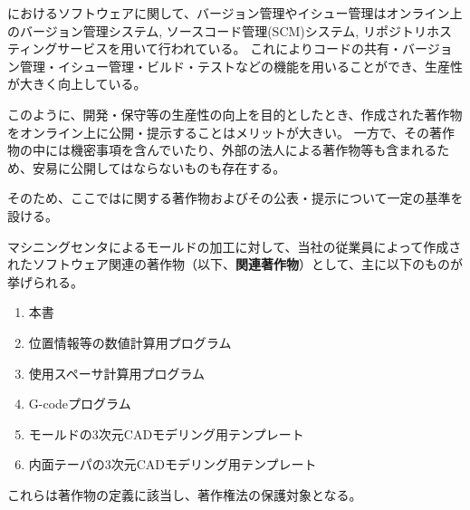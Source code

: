 

\DMname におけるソフトウェアに関して、バージョン管理やイシュー管理はオンライン上のバージョン管理システム, ソースコード管理(SCM)システム, リポジトリホスティングサービスを用いて行われている。
これによりコードの共有・バージョン管理・イシュー管理・ビルド・テストなどの機能を用いることができ、生産性が大きく向上している。

このように、開発・保守等の生産性の向上を目的としたとき、作成された著作物をオンライン上に公開・提示することはメリットが大きい。
一方で、その著作物の中には機密事項を含んでいたり、外部の法人による著作物等も含まれるため、安易に公開してはならないものも存在する。

そのため、ここでは\DMname に関する著作物およびその公表・提示について一定の基準を設ける。



マシニングセンタによるモールドの加工に対して、当社の従業員によって作成されたソフトウェア関連の著作物（以下、\textbf{関連著作物}）として、主に以下のものが挙げられる。
\begin{enumerate}
\item 本書
\item 位置情報等の数値計算用プログラム
\item 使用スペーサ計算用プログラム
\item G-codeプログラム
\item モールドの3次元CADモデリング用テンプレート
\item 内面テーパの3次元CADモデリング用テンプレート
\end{enumerate}
これらは著作物の定義に該当し、著作権法の保護対象となる。



